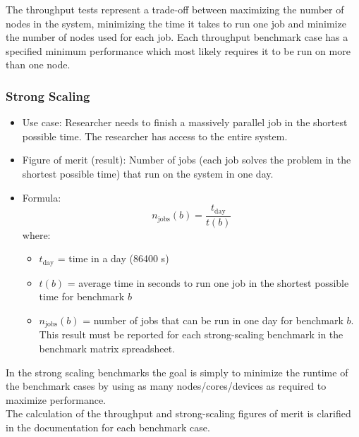 \documentclass{article}
\begin{document}
The throughput tests represent a trade-off between maximizing the number of nodes in the system, minimizing the time it takes to run one job and minimize the number of nodes used for each job. Each
throughput benchmark case has a specified minimum performance which most likely requires it to be run on more than one node.

\subsubsection*{Strong Scaling}

\begin{itemize}
    \item Use case: Researcher needs to finish a massively parallel job in the shortest possible time. The researcher has access to the entire system.
    \item Figure of merit (result): Number of jobs (each job solves the problem in the shortest possible time) that run on the system in one day.
    \item Formula:
    \begin{equation}
        n_{\textrm{jobs}}(b) = \frac{t_{\textrm{day}}}{t(b)} 
    \end{equation}
    where:
    \begin{itemize}
        \item $t_{\textrm{day}}$ = time in a day (86400 s)
        \item $t(b)$ = average time in seconds to run one job in the shortest possible time for benchmark $b$
        \item $n_{\textrm{jobs}}(b)$ = number of jobs that can be run in one day for benchmark $b$. This result must be reported for each strong-scaling benchmark in the benchmark matrix spreadsheet.
    \end{itemize}
\end{itemize}

In the strong scaling benchmarks the goal is simply to minimize the runtime of the benchmark cases by using as many nodes/cores/devices as required to maximize performance.\\

The calculation of the throughput and strong-scaling figures of merit
is clarified in the documentation for each benchmark case.
\end{document}
